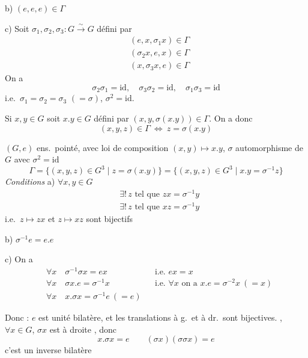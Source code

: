 \documentclass[11pt,a4paper]{article}
\begin{document}
b) $(e,e,e)\in\Gamma$

c) Soit $\sigma_1,\sigma_2,\sigma_3 : G\xrightarrow{\sim}G$ défini par
\[
  \begin{aligned}
    &(e,x,\sigma_1x)\in\Gamma\\
    &(\sigma_2x,e,x)\in\Gamma\\
    &(x,\sigma_3x,e)\in\Gamma
  \end{aligned}
\]
On a 
\[
  \sigma_2\sigma_1=\mathrm{id},\quad \sigma_3\sigma_2=\mathrm{id},\quad \sigma_1\sigma_3=\mathrm{id}
\]
i.e.\ $\sigma_1=\sigma_2=\sigma_3$ $(=\sigma)$, $\sigma^2=\mathrm{id}$.

Si $x,y\in G$ soit $x.y\in G$ défini par $(x,y,\sigma(x.y))\in\Gamma$. On a donc 
\[
  (x,y,z)\in\Gamma\ \Longleftrightarrow\ z=\sigma(x.y)
\]

$(G,e)$ ens.\ pointé, avec loi de composition $(x,y)\mapsto x.y$, $\sigma$ automorphisme de $G$  avec $\sigma^2=\mathrm{id}$
\[
  \Gamma=\{(x,y,z)\in G^3 \mid z=\sigma(x.y)\}=\{(x,y,z)\in G^3\mid x.y=\sigma^{-1}z\}
\]
\emph{Conditions} a) $\forall x,y\in G$
\[
  \begin{aligned}
    &\exists!\,z \text{ tel que } zx=\sigma^{-1}y\\
    &\exists!\,z \text{ tel que } xz=\sigma^{-1}y
  \end{aligned}
\]
i.e.\ $z\mapsto zx$ et $z\mapsto xz$ sont bijectifs

b) $\sigma^{-1}e=e.e$

c) On a
\[
  \begin{aligned}
    &\forall x\quad \sigma^{-1}\sigma x=ex &&\text{i.e. } ex=x\\
    &\forall x\quad \sigma x.e=\sigma^{-1}x &&\text{i.e. } \forall x \text{ on a } x.e=\sigma^{-2}x\ (=x)\\
    &\forall x\quad x.\sigma x=\sigma^{-1}e\ (=e)
  \end{aligned}
\]


Donc : $e$ est unité bilatère,  et les translations à g.\ et à dr.\ sont bijectives. , $\forall x\in G$, $\sigma x$ est   à droite , donc 
\[
  x.\sigma x=e\qquad (\sigma x)(\sigma\sigma x)=e
\]
 \quad c'est un inverse bilatère 
\end{document}
